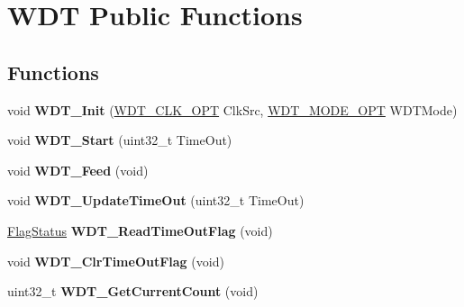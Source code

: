 \hypertarget{group___w_d_t___public___functions}{\section{\-W\-D\-T \-Public \-Functions}
\label{group___w_d_t___public___functions}
}
\subsection*{\-Functions}
\begin{DoxyCompactItemize}
\item 
\hypertarget{group___w_d_t___public___functions_gac11f9e65f881f7034e23017ea51c0860}{void {\bfseries \-W\-D\-T\-\_\-\-Init} (\hyperlink{group___w_d_t___public___types_ga3f09add7f3b0d382e9bb23db3cf37bb4}{\-W\-D\-T\-\_\-\-C\-L\-K\-\_\-\-O\-P\-T} \-Clk\-Src, \hyperlink{group___w_d_t___public___types_ga9bef6b40714143d8ce7a190d387801fc}{\-W\-D\-T\-\_\-\-M\-O\-D\-E\-\_\-\-O\-P\-T} \-W\-D\-T\-Mode)}\label{group___w_d_t___public___functions_gac11f9e65f881f7034e23017ea51c0860}

\item 
\hypertarget{group___w_d_t___public___functions_ga4de34e16965b4d940292b3c33530021b}{void {\bfseries \-W\-D\-T\-\_\-\-Start} (uint32\-\_\-t \-Time\-Out)}\label{group___w_d_t___public___functions_ga4de34e16965b4d940292b3c33530021b}

\item 
\hypertarget{group___w_d_t___public___functions_ga5c06bc90a0e3a721bdf07ae0817d58c8}{void {\bfseries \-W\-D\-T\-\_\-\-Feed} (void)}\label{group___w_d_t___public___functions_ga5c06bc90a0e3a721bdf07ae0817d58c8}

\item 
\hypertarget{group___w_d_t___public___functions_ga3e0ca3fdcff8c2790ae74113cf57af3f}{void {\bfseries \-W\-D\-T\-\_\-\-Update\-Time\-Out} (uint32\-\_\-t \-Time\-Out)}\label{group___w_d_t___public___functions_ga3e0ca3fdcff8c2790ae74113cf57af3f}

\item 
\hypertarget{group___w_d_t___public___functions_gabf31793b4f76d60ca737da42c41b0eac}{\hyperlink{group___l_p_c___types___public___types_ga89136caac2e14c55151f527ac02daaff}{\-Flag\-Status} {\bfseries \-W\-D\-T\-\_\-\-Read\-Time\-Out\-Flag} (void)}\label{group___w_d_t___public___functions_gabf31793b4f76d60ca737da42c41b0eac}

\item 
\hypertarget{group___w_d_t___public___functions_ga82797946fa5a5dc12370ba68d3f31881}{void {\bfseries \-W\-D\-T\-\_\-\-Clr\-Time\-Out\-Flag} (void)}\label{group___w_d_t___public___functions_ga82797946fa5a5dc12370ba68d3f31881}

\item 
\hypertarget{group___w_d_t___public___functions_ga373bff2b235362f28fb3b115fe37c98f}{uint32\-\_\-t {\bfseries \-W\-D\-T\-\_\-\-Get\-Current\-Count} (void)}\label{group___w_d_t___public___functions_ga373bff2b235362f28fb3b115fe37c98f}

\end{DoxyCompactItemize}
